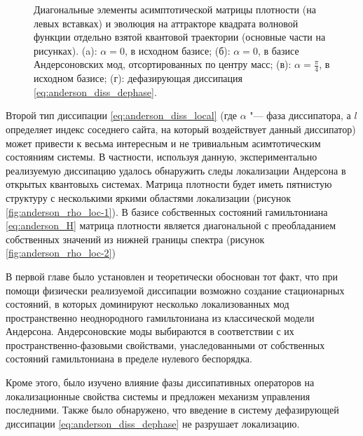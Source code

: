 \begin{figure}[ht]
	\legend{}
	\caption[Динамика квантовых траекторий на квантовых аттракторах в зависимости от параметров неэрмитовой диссипации]
	{
		Диагональные элементы асимптотической матрицы плотности (на левых вставках) и эволюция на аттракторе квадрата волновой функции отдельно взятой квантовой траектории (основные части на рисунках). (a): \(\alpha = 0\), в исходном базисе; (б): \(\alpha = 0\), в базисе Андерсоновских мод, отсортированных по центру масс; (в): \(\alpha=\frac{\pi}{4}\), в исходном базисе; (г): дефазирующая диссипация \cref{eq:anderson_diss_dephase}. 
	}
	\label{fig:anderson_prb_2}
\end{figure}

Второй тип диссипации \cref{eq:anderson_diss_local} (где \(\alpha\) "--- фаза диссипатора, а \(l\) определяет индекс соседнего сайта, на который воздействует данный диссипатор) может привести к весьма интересным и не тривиальным асимтотическим состояниям системы. 
В частности, используя данную, экспериментально реализуемую диссипацию удалось обнаружить следы локализации Андерсона в открытых квантовыхь системах. Матрица плотности будет иметь пятнистую структуру с несколькими яркими областями локализации (рисунок \cref{fig:anderson_rho_loc-1}). 
В базисе собственных состояний гамильтониана \cref{eq:anderson_H} матрица плотности является диагональной с преобладанием собственных значений из нижней границы спектра (рисунок \cref{fig:anderson_rho_loc-2})

В первой главе было установлен и теоретически обоснован тот факт, что при помощи физически реализуемой диссипации возможно создание стационарных состояний, в которых доминируют несколько локализованных мод пространственно неоднородного гамильтониана из классической модели Андерсона. Андерсоновские моды выбираются в соответствии с их пространственно-фазовыми свойствами, унаследованными от собственных состояний гамильтониана в пределе нулевого беспорядка.

Кроме этого, было изучено влияние фазы диссипативных операторов на локализационные свойства системы и предложен механизм управления последними. Также было обнаружено, что введение в систему дефазирующей диссипации \cref{eq:anderson_diss_dephase} не разрушает локализацию.

